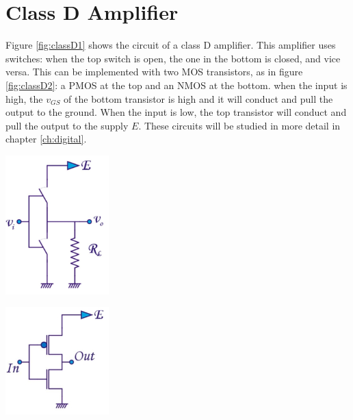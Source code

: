 \section{Class D Amplifier}
Figure \ref{fig:classD1} shows the circuit of a class D amplifier. This amplifier uses switches: when the top switch is open, the one in the bottom is closed, and vice versa. This can be implemented with two MOS transistors, as in figure \ref{fig:classD2}: a PMOS at the top and an NMOS at the bottom. when the input is high, the $v_{GS}$ of the bottom transistor is high and it will conduct and pull the output to the ground. When the input is low, the top transistor will conduct and pull the output to the supply $E$. These circuits will be studied in more detail in chapter \ref{ch:digital}.

\begin{minipage}{.5\textwidth}
	\centering
	\includegraphics[width=4cm]{figures/ch09/classD1.jpg}
	\label{fig:classD1}
\end{minipage}%
\begin{minipage}{.5\textwidth}
	\centering
	\includegraphics[width=4cm]{figures/ch09/classD2.jpg}
	\label{fig:classD2}
\end{minipage}

